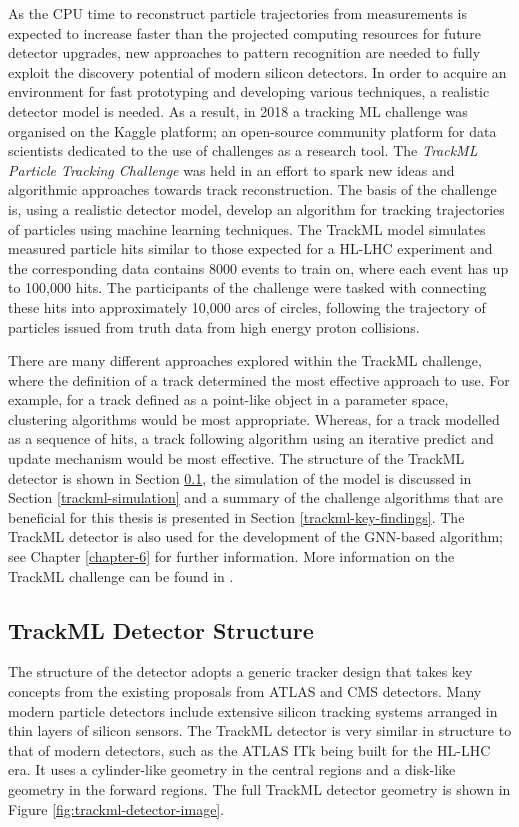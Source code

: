 As the CPU time to reconstruct particle trajectories from measurements is expected to increase faster than the projected computing resources for future detector upgrades, new approaches to pattern recognition are needed to fully exploit the discovery potential of modern silicon detectors. In order to acquire an environment for fast prototyping and developing various techniques, a realistic detector model is needed. As a result, in 2018 a tracking ML challenge was organised on the Kaggle platform; an open-source community platform for data scientists dedicated to the use of challenges as a research tool. The \textit{TrackML Particle Tracking Challenge} \cite{kaggle-trackml} was held in an effort to spark new ideas and algorithmic approaches towards track reconstruction. The basis of the challenge is, using a realistic detector model, develop an algorithm for tracking trajectories of particles using machine learning techniques. The TrackML model simulates measured particle hits similar to those expected for a HL-LHC experiment and the corresponding data contains 8000 events to train on, where each event has up to 100,000 hits. The participants of the challenge were tasked with connecting these hits into approximately 10,000 arcs of circles, following the trajectory of particles issued from truth data from high energy proton collisions. 

There are many different approaches explored within the TrackML challenge, where the definition of a track determined the most effective approach to use. For example, for a track defined as a point-like object in a parameter space, clustering algorithms would be most appropriate. Whereas, for a track modelled as a sequence of hits, a track following algorithm using an iterative predict and update mechanism would be most effective. The structure of the TrackML detector is shown in Section \ref{trackml-structure}, the simulation of the model is discussed in Section \ref{trackml-simulation} and a summary of the challenge algorithms that are beneficial for this thesis is presented in Section \ref{trackml-key-findings}. The TrackML detector is also used for the development of the GNN-based algorithm; see Chapter \ref{chapter-6} for further information. More information on the TrackML challenge can be found in \cite{Amrouche_2019}.

\subsection{TrackML Detector Structure}
\label{trackml-structure}
The structure of the detector adopts a generic tracker design that takes key concepts from the existing proposals from ATLAS and CMS detectors. Many modern particle detectors include extensive silicon tracking systems arranged in thin layers of silicon sensors. The TrackML detector is very similar in structure to that of modern detectors, such as the ATLAS ITk \cite{inner-detector-TDR} being built for the HL-LHC era. It uses a cylinder-like geometry in the central regions and a disk-like geometry in the forward regions. The full TrackML detector geometry is shown in Figure \ref{fig:trackml-detector-image}. 


